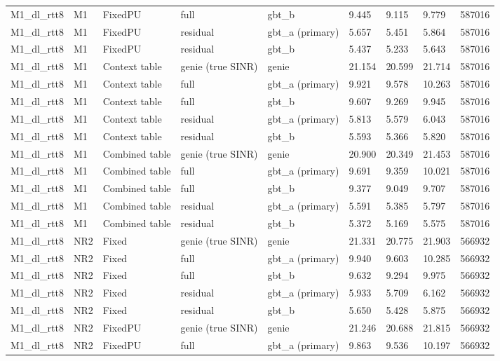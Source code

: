 \documentclass[10pt]{article}
\begin{document}
\begin{landscape}
\begin{longtable}{@{}lllllllll@{}}
M1\_dl\_rtt8 & M1 & FixedPU & full & gbt\_b & 9.445 & 9.115 & 9.779 & 587016 \\
M1\_dl\_rtt8 & M1 & FixedPU & residual & gbt\_a (primary) & 5.657 & 5.451 & 5.864 & 587016 \\
M1\_dl\_rtt8 & M1 & FixedPU & residual & gbt\_b & 5.437 & 5.233 & 5.643 & 587016 \\
M1\_dl\_rtt8 & M1 & Context table & genie (true SINR) & genie & 21.154 & 20.599 & 21.714 & 587016 \\
M1\_dl\_rtt8 & M1 & Context table & full & gbt\_a (primary) & 9.921 & 9.578 & 10.263 & 587016 \\
M1\_dl\_rtt8 & M1 & Context table & full & gbt\_b & 9.607 & 9.269 & 9.945 & 587016 \\
M1\_dl\_rtt8 & M1 & Context table & residual & gbt\_a (primary) & 5.813 & 5.579 & 6.043 & 587016 \\
M1\_dl\_rtt8 & M1 & Context table & residual & gbt\_b & 5.593 & 5.366 & 5.820 & 587016 \\
M1\_dl\_rtt8 & M1 & Combined table & genie (true SINR) & genie & 20.900 & 20.349 & 21.453 & 587016 \\
M1\_dl\_rtt8 & M1 & Combined table & full & gbt\_a (primary) & 9.691 & 9.359 & 10.021 & 587016 \\
M1\_dl\_rtt8 & M1 & Combined table & full & gbt\_b & 9.377 & 9.049 & 9.707 & 587016 \\
M1\_dl\_rtt8 & M1 & Combined table & residual & gbt\_a (primary) & 5.591 & 5.385 & 5.797 & 587016 \\
M1\_dl\_rtt8 & M1 & Combined table & residual & gbt\_b & 5.372 & 5.169 & 5.575 & 587016 \\
M1\_dl\_rtt8 & NR2 & Fixed & genie (true SINR) & genie & 21.331 & 20.775 & 21.903 & 566932 \\
M1\_dl\_rtt8 & NR2 & Fixed & full & gbt\_a (primary) & 9.940 & 9.603 & 10.285 & 566932 \\
M1\_dl\_rtt8 & NR2 & Fixed & full & gbt\_b & 9.632 & 9.294 & 9.975 & 566932 \\
M1\_dl\_rtt8 & NR2 & Fixed & residual & gbt\_a (primary) & 5.933 & 5.709 & 6.162 & 566932 \\
M1\_dl\_rtt8 & NR2 & Fixed & residual & gbt\_b & 5.650 & 5.428 & 5.875 & 566932 \\
M1\_dl\_rtt8 & NR2 & FixedPU & genie (true SINR) & genie & 21.246 & 20.688 & 21.815 & 566932 \\
M1\_dl\_rtt8 & NR2 & FixedPU & full & gbt\_a (primary) & 9.863 & 9.536 & 10.197 & 566932 \\

\end{longtable}
\end{landscape}
\end{document}
